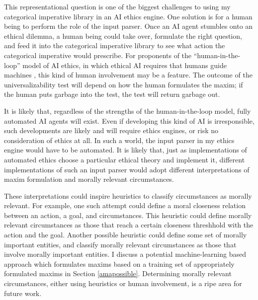\begin{isabellebody}
\begin{isamarkuptext}
This representational question is one of the biggest challenges to using my categorical imperative library
in an AI ethics engine. One solution is for a human being to perform the role of the input
parser. Once an AI agent stumbles onto an ethical dilemma, a human being could take over, formulate 
the right question, and feed it into the categorical imperative library to see what action the categorical 
imperative would prescribe. For proponents of the ``human-in-the-loop'' model of AI ethics, in which 
ethical AI requires that humans guide machines \citep{loop}, this kind of human involvement may be a feature.
The outcome of the universalizability test will depend on how the human formulates the maxim; if the 
human puts garbage into the test, the test will return garbage out.

It is likely that, regardless of the strengths of the human-in-the-loop model, fully automated AI 
agents will exist. Even if developing this kind of AI is irresponsible,
such developments are likely and will require ethics engines, or risk no consideration of ethics at all.
In such a world, the input parser in my ethics engine would have to be automated.
It is likely that, just as implementations of automated ethics choose 
a particular ethical theory and implement it, different implementations of such an input parser would 
adopt different interpretations of maxim formulation and morally relevant circumstances. 

These interpretations could inspire heuristics to classify circumstances as morally 
relevant. For example, one such attempt could define a moral closeness relation between an action, a 
goal, and circumstances. This heuristic could define morally relevant circumstances as those that 
reach a certain closeness threshhold with the action and the goal. Another possible heuristic could 
define some set of morally important entities, and classify morally relevant circumstances as those
that involve morally important entities. I discuss a potential machine-learning based approach which formulates
maxims based on a training set of appropriately formulated maxims in Section \ref{amapossible}.
Determining morally relevant circumstances, either using heuristics or human involvement, is a ripe 
area for future work.


\end{isamarkuptext}
\end{isabellebody}
